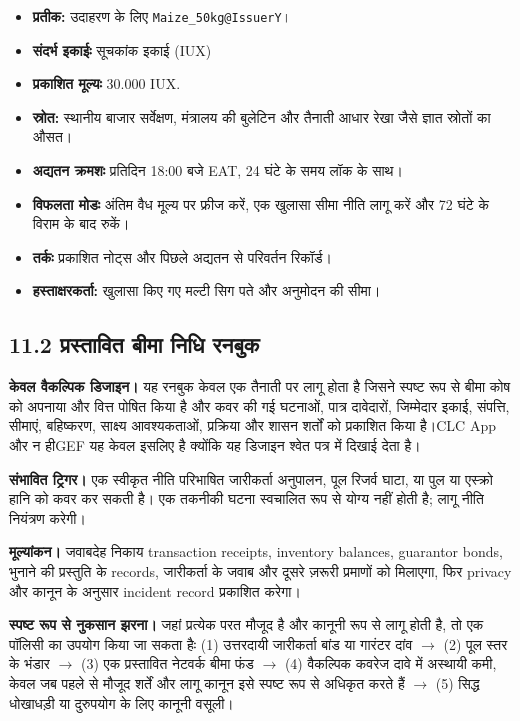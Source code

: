 \documentclass[11pt]{article}
\begin{document}
\begin{itemize}[leftmargin=*]
\item \textbf{प्रतीक:} उदाहरण के लिए \texttt{Maize\_50kg@IssuerY}।
\item \textbf{संदर्भ इकाईः} सूचकांक इकाई (IUX)
\item \textbf{प्रकाशित मूल्यः} 30.000 IUX.
\item \textbf{स्रोत:} स्थानीय बाजार सर्वेक्षण, मंत्रालय की बुलेटिन और तैनाती आधार रेखा जैसे ज्ञात स्रोतों का औसत।
\item \textbf{अद्यतन क्रमशः} प्रतिदिन 18:00 बजे EAT, 24 घंटे के समय लॉक के साथ।
\item \textbf{विफलता मोडः} अंतिम वैध मूल्य पर फ्रीज करें, एक खुलासा सीमा नीति लागू करें और 72 घंटे के विराम के बाद रुकें।
\item \textbf{तर्कः} प्रकाशित नोट्स और पिछले अद्यतन से परिवर्तन रिकॉर्ड।
\item \textbf{हस्ताक्षरकर्ता:} खुलासा किए गए मल्टी सिग पते और अनुमोदन की सीमा।
\end{itemize}
\subsection*{11.2 प्रस्तावित बीमा निधि रनबुक}

\textbf{केवल वैकल्पिक डिजाइन।} यह रनबुक केवल एक तैनाती पर लागू होता है जिसने स्पष्ट रूप से बीमा कोष को अपनाया और वित्त पोषित किया है और कवर की गई घटनाओं, पात्र दावेदारों, जिम्मेदार इकाई, संपत्ति, सीमाएं, बहिष्करण, साक्ष्य आवश्यकताओं, प्रक्रिया और शासन शर्तों को प्रकाशित किया है।CLC App और न हीGEF यह केवल इसलिए है क्योंकि यह डिजाइन श्वेत पत्र में दिखाई देता है।

\textbf{संभावित ट्रिगर।} एक स्वीकृत नीति परिभाषित जारीकर्ता अनुपालन, पूल रिजर्व घाटा, या पुल या एस्क्रो हानि को कवर कर सकती है। एक तकनीकी घटना स्वचालित रूप से योग्य नहीं होती है; लागू नीति नियंत्रण करेगी।

\textbf{मूल्यांकन।} जवाबदेह निकाय transaction receipts, inventory balances, guarantor bonds, भुनाने की प्रस्तुति के records, जारीकर्ता के जवाब और दूसरे ज़रूरी प्रमाणों को मिलाएगा, फिर privacy और कानून के अनुसार incident record प्रकाशित करेगा।

\textbf{स्पष्ट रूप से नुकसान झरना।} जहां प्रत्येक परत मौजूद है और कानूनी रूप से लागू होती है, तो एक पॉलिसी का उपयोग किया जा सकता हैः (1) उत्तरदायी जारीकर्ता बांड या गारंटर दांव $\to$ (2) पूल स्तर के भंडार $\to$ (3) एक प्रस्तावित नेटवर्क बीमा फंड $\to$ (4) वैकल्पिक कवरेज दावे में अस्थायी कमी, केवल जब पहले से मौजूद शर्तें और लागू कानून इसे स्पष्ट रूप से अधिकृत करते हैं $\to$ (5) सिद्ध धोखाधड़ी या दुरुपयोग के लिए कानूनी वसूली।
\end{document}
